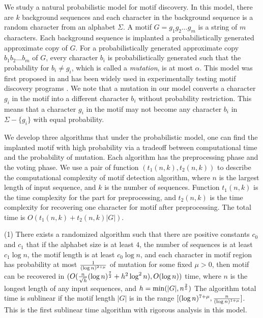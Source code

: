 \documentclass[11pt]{article}
\begin{document}
We study a natural probabilistic model for motif discovery. In this
model, there are $k$ background sequences and each character in the
background sequence is a random character from an alphabet $\Sigma$.
A motif $G=g_1g_2\ldots g_m$ is a string of $m$ characters. Each
background sequence is implanted a probabilistically generated
approximate copy of  $G$.  For a probabilistically  generated
approximate copy $b_1b_2\ldots b_m$ of $G$, every character $b_i$ is
probabilistically  generated such that the probability for $b_i\neq
g_i$, which is called a {\it mutation}, is at most $\alpha$. This
model was first proposed in \cite{PevznerSze00} and has been widely
used in experimentally testing motif discovery programs
\cite{KeichPevzner02,KeichPevzner02b,WangDong05,ChinLeung05}. We
note that a mutation in our model converts a character $g_i$ in  the
motif into a different character $b_i$ without probability
restriction. This means that a character $g_i$ in the motif may not
become any character $b_i$ in $\Sigma-\{g_i\}$ with equal
probability.

We develop three algorithms that under the probabilistic model, one
can find the implanted motif with high probability via a tradeoff
between computational time and the probability of mutation. Each
algorithm has the preprocessing phase and the voting phase. We use a
pair of function $(t_1(n,k), t_2(n,k))$ to describe the
computational complexity of motif detection algorithm, where $n$ is
the largest length of input sequence, and $k$ is the number of
sequences. Function $t_1(n,k)$ is the time complexity for the part
for preprocessing,  and $t_2(n,k)$ is the time complexity for
recovering one character for motif after preprocessing. The total
time is $O(t_1(n,k)+t_2(n,k)|G|)$.

(1) There exists a randomized algorithm such that there are positive
constants $c_0$ and $c_1$ that if the alphabet size is at least $4$,
the number of sequences is at least $c_1\log n$, the motif length is
at least $c_0\log n$, and each character in motif region has
probability at most ${1\over (\log n)^{2+\mu}}$ of mutation for some
fixed $\mu>0$, then motif can be recovered in $(O({n\over
\sqrt{h}}(\log n)^{7\over 2}+h^2\log^2 n), O(\log n))$ time, where
$n$ is the longest length of any input sequences, and
$h=\min(|G|,n^{2\over 5})$
 The algorithm total time is sublinear if the motif
length $|G|$ is in the range  $[(\log n)^{7+\mu}, {n\over (\log
n)^{1+\mu}}]$. This is the first sublinear time algorithm with
rigorous analysis in this model.
\end{document}
